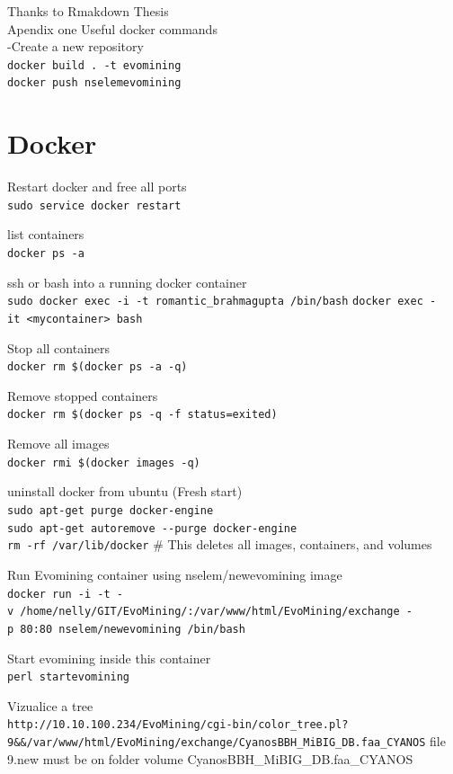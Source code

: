 \documentclass[12pt,twoside]{reedthesis}
\begin{document}
  Thanks to Rmakdown Thesis\\
  Apendix one Useful docker commands\\
  -Create a new repository\\
  \texttt{docker\ build\ .\ -t\ evomining}\\
  \texttt{docker\ push\ nselemevomining}
  
  \section{Docker}\label{docker}
  
  Restart docker and free all ports\\
  \texttt{sudo\ service\ docker\ restart}
  
  list containers\\
  \texttt{docker\ ps\ -a}
  
  ssh or bash into a running docker container\\
  \texttt{sudo\ docker\ exec\ -i\ -t\ romantic\_brahmagupta\ /bin/bash}
  \texttt{docker\ exec\ -it\ \textless{}mycontainer\textgreater{}\ bash}
  
  Stop all containers\\
  \texttt{docker\ rm\ \$(docker\ ps\ -a\ -q)}
  
  Remove stopped containers\\
  \texttt{docker\ rm\ \$(docker\ ps\ -q\ -f\ status=exited)}
  
  Remove all images\\
  \texttt{docker\ rmi\ \$(docker\ images\ -q)}
  
  uninstall docker from ubuntu (Fresh start)\\
  \texttt{sudo\ apt-get\ purge\ docker-engine}\\
  \texttt{sudo\ apt-get\ autoremove\ -\/-purge\ docker-engine}\\
  \texttt{rm\ -rf\ /var/lib/docker} \# This deletes all images,
  containers, and volumes
  
  Run Evomining container using nselem/newevomining image\\
  \texttt{docker\ run\ -i\ -t\ -v\ /home/nelly/GIT/EvoMining/:/var/www/html/EvoMining/exchange\ -p\ 80:80\ nselem/newevomining\ /bin/bash}
  
  Start evomining inside this container\\
  \texttt{perl\ startevomining}
  
  Vizualice a tree\\
  \texttt{http://10.10.100.234/EvoMining/cgi-bin/color\_tree.pl?9\&\&/var/www/html/EvoMining/exchange/CyanosBBH\_MiBIG\_DB.faa\_CYANOS}
  file 9.new must be on folder volume CyanosBBH\_MiBIG\_DB.faa\_CYANOS
  
\end{document}
